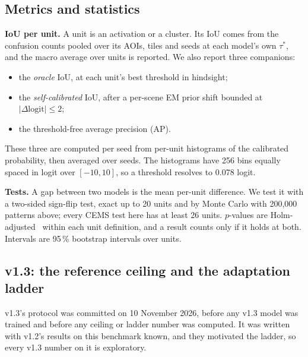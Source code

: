 \documentclass[10pt,twocolumn,a4paper]{article}
\newcommand{\pp}{\,\%}
\begin{document}
\subsection{Metrics and statistics}\label{sec:metrics}
\textbf{IoU per unit.} A unit is an activation or a cluster. Its IoU comes from the confusion counts pooled over its
AOIs, tiles and seeds at each model's own $\tau^{*}$, and the macro average over units is reported. We also report
three companions:
\begin{itemize}
  \item the \emph{oracle} IoU, at each unit's best threshold in hindsight;
  \item the \emph{self-calibrated} IoU, after a per-scene EM prior shift bounded at $|\Delta\mathrm{logit}|\leq2$;
  \item the threshold-free average precision (AP).
\end{itemize}
These three are computed per seed from per-unit histograms of the calibrated probability, then averaged over seeds.
The histograms have 256 bins equally spaced in logit over $[-10, 10]$, so a threshold resolves to 0.078 logit.

\textbf{Tests.} A gap between two models is the mean per-unit difference. We test it with a two-sided sign-flip test, exact
up to 20 units and by Monte Carlo with 200,000 patterns above; every CEMS test here has at least 26 units. $p$-values are Holm-adjusted~\citep{holm1979}
within each unit definition, and a result counts only if it holds at both. Intervals are 95\pp{} bootstrap intervals
over units.

\subsection{v1.3: the reference ceiling and the adaptation ladder}\label{sec:v13methods}
v1.3's protocol was committed on 10 November 2026, before any v1.3 model was trained and before any ceiling or
ladder number was computed. It was written with v1.2's results on this benchmark known, and they motivated the
ladder, so every v1.3 number on it is exploratory.
\end{document}
